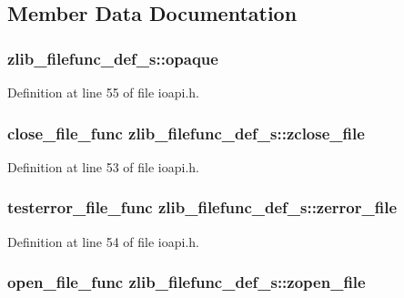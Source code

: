 \subsection{Member Data Documentation}
\hypertarget{structzlib__filefunc__def__s_a494b6d634b61bdc7fc7caed8e4fbe3f4}{
\subsubsection[{opaque}]{ zlib\+\_\+filefunc\+\_\+def\+\_\+s\+::opaque}}\label{structzlib__filefunc__def__s_a494b6d634b61bdc7fc7caed8e4fbe3f4}


Definition at line 55 of file ioapi.\+h.

\hypertarget{structzlib__filefunc__def__s_ac46ac7ec0540dce117dab3f210d26763}{
\subsubsection[{zclose\+\_\+file}]{\setlength{\rightskip}{0pt plus 5cm}close\+\_\+file\+\_\+func zlib\+\_\+filefunc\+\_\+def\+\_\+s\+::zclose\+\_\+file}}\label{structzlib__filefunc__def__s_ac46ac7ec0540dce117dab3f210d26763}


Definition at line 53 of file ioapi.\+h.

\hypertarget{structzlib__filefunc__def__s_a61182b5b3ff83fb509b57ab4d2d9816d}{
\subsubsection[{zerror\+\_\+file}]{\setlength{\rightskip}{0pt plus 5cm}testerror\+\_\+file\+\_\+func zlib\+\_\+filefunc\+\_\+def\+\_\+s\+::zerror\+\_\+file}}\label{structzlib__filefunc__def__s_a61182b5b3ff83fb509b57ab4d2d9816d}


Definition at line 54 of file ioapi.\+h.

\hypertarget{structzlib__filefunc__def__s_a49b78a559140e495b94af4d9dfe5c4e9}{
\subsubsection[{zopen\+\_\+file}]{\setlength{\rightskip}{0pt plus 5cm}open\+\_\+file\+\_\+func zlib\+\_\+filefunc\+\_\+def\+\_\+s\+::zopen\+\_\+file}}\label{structzlib__filefunc__def__s_a49b78a559140e495b94af4d9dfe5c4e9}


